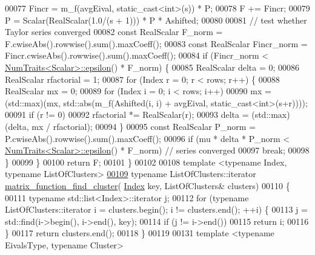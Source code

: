 \begin{DoxyCode}
00077     Fincr = m\_f(avgEival, static\_cast<int>(s)) * P;
00078     F += Fincr;
00079     P = Scalar(RealScalar(1.0/(s + 1))) * P * Ashifted;
00080 
00081     \textcolor{comment}{// test whether Taylor series converged}
00082     \textcolor{keyword}{const} RealScalar F\_norm = F.cwiseAbs().rowwise().sum().maxCoeff();
00083     \textcolor{keyword}{const} RealScalar Fincr\_norm = Fincr.cwiseAbs().rowwise().sum().maxCoeff();
00084     \textcolor{keywordflow}{if} (Fincr\_norm < \hyperlink{group___core___module_struct_eigen_1_1_num_traits}{NumTraits<Scalar>::epsilon}() * F\_norm) \{
00085       RealScalar delta = 0;
00086       RealScalar rfactorial = 1;
00087       \textcolor{keywordflow}{for} (Index r = 0; r < rows; r++) \{
00088         RealScalar mx = 0;
00089         \textcolor{keywordflow}{for} (Index i = 0; i < rows; i++)
00090           mx = (std::max)(mx, std::abs(m\_f(Ashifted(i, i) + avgEival, static\_cast<int>(s+r))));
00091         \textcolor{keywordflow}{if} (r != 0)
00092           rfactorial *= RealScalar(r);
00093         delta = (std::max)(delta, mx / rfactorial);
00094       \}
00095       \textcolor{keyword}{const} RealScalar P\_norm = P.cwiseAbs().rowwise().sum().maxCoeff();
00096       \textcolor{keywordflow}{if} (mu * delta * P\_norm < \hyperlink{group___core___module_struct_eigen_1_1_num_traits}{NumTraits<Scalar>::epsilon}() * F\_norm) \textcolor{comment}{// series
       converged}
00097         \textcolor{keywordflow}{break};
00098     \}
00099   \}
00100   \textcolor{keywordflow}{return} F;
00101 \}
00102 
00108 \textcolor{keyword}{template} <\textcolor{keyword}{typename} Index, \textcolor{keyword}{typename} ListOfClusters>
\hyperlink{namespace_eigen_1_1internal_af9cdbae9f4f166fae876c54b97c0f2bb}{00109} \textcolor{keyword}{typename} ListOfClusters::iterator \hyperlink{namespace_eigen_1_1internal_af9cdbae9f4f166fae876c54b97c0f2bb}{matrix\_function\_find\_cluster}(
      \hyperlink{namespace_eigen_a62e77e0933482dafde8fe197d9a2cfde}{Index} key, ListOfClusters& clusters)
00110 \{
00111   \textcolor{keyword}{typename} std::list<Index>::iterator j;
00112   \textcolor{keywordflow}{for} (\textcolor{keyword}{typename} ListOfClusters::iterator i = clusters.begin(); i != clusters.end(); ++i) \{
00113     j = std::find(i->begin(), i->end(), key);
00114     \textcolor{keywordflow}{if} (j != i->end())
00115       \textcolor{keywordflow}{return} i;
00116   \}
00117   \textcolor{keywordflow}{return} clusters.end();
00118 \}
00119 
00131 \textcolor{keyword}{template} <\textcolor{keyword}{typename} EivalsType, \textcolor{keyword}{typename} Cluster>

\end{DoxyCode}
